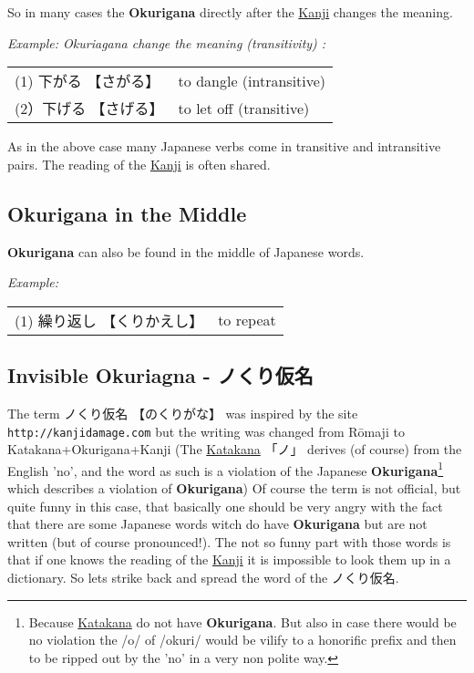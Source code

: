 So in many cases the \textbf{Okurigana} directly after the
\hyperref[sec:Kanji]{Kanji} changes the meaning.

\textit{Example: Okuriagana change the meaning (transitivity) :}

\begin{center}\begin{tabular}{ll}
(1) {下がる} {【さがる】} &  to dangle (intransitive)\\
(2）{下げる} {【さげる】} &  to let off (transitive)\\
\end{tabular}\end{center}

As in the above case many Japanese verbs come in transitive and intransitive
pairs.  The reading of the \hyperref[sec:Kanji]{Kanji} is often shared. 

\subsection*{Okurigana in the Middle}

\textbf{Okurigana} can also be found in the middle of Japanese words.

\textit{Example:}

\begin{center}\begin{tabular}{ll}
(1) {繰り返し} {【くりかえし】} &  to repeat\\
\end{tabular}\end{center}

\subsection*{Invisible Okuriagna - ノくり仮名}

The term {ノくり仮名} {【のくりがな】} was inspired by the site
\texttt{http://kanjidamage.com} but the writing was changed from Rōmaji to
Katakana+Okurigana+Kanji (The \hyperref[sec:Katakana]{Katakana} {「ノ」}
derives (of course) from the English 'no', and the word as such is a violation
of the Japanese \textbf{Okurigana}\footnote{Because
\hyperref[sec:Katakana]{Katakana} do not have \textbf{Okurigana}. But also in case there
would be no violation the /o/ of /okuri/ would be vilify to a honorific prefix
and then to be ripped out by the 'no' in a very non polite way.} which
describes a violation of \textbf{Okurigana}) Of course the term  is not
official, but quite funny in this case, that basically one should be very angry
with the fact that there are some Japanese words witch do have
\textbf{Okurigana} but are not written (but of course pronounced!).  The not so
funny part with those words is that if one knows the reading of the
\hyperref[sec:Kanji]{Kanji} it is impossible to look them up in a dictionary. So 
lets strike back and spread the word of the ノくり仮名.

